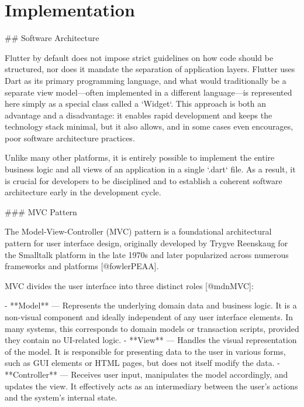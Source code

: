 \documentclass[
  digital,     %
  oneside,     %
  nosansbold,  %
  nocolorbold, %
  lof,         %
  lot,         %
]{fithesis4}
\begin{document}
\chapter{Implementation}
\shorthandoff{-}
\begin{markdown}

## Software Architecture

Flutter by default does not impose strict guidelines on how code should be structured, nor does it mandate the separation of application layers. Flutter uses Dart as its primary programming language, and what would traditionally be a separate view model—often implemented in a different language—is represented here simply as a special class called a `Widget`. This approach is both an advantage and a disadvantage: it enables rapid development and keeps the technology stack minimal, but it also allows, and in some cases even encourages, poor software architecture practices.

Unlike many other platforms, it is entirely possible to implement the entire business logic and all views of an application in a single `.dart` file. As a result, it is crucial for developers to be disciplined and to establish a coherent software architecture early in the development cycle.

### MVC Pattern

The Model-View-Controller (MVC) pattern is a foundational architectural pattern for user interface design, originally developed by Trygve Reenskaug for the Smalltalk platform in the late 1970s and later popularized across numerous frameworks and platforms [@fowlerPEAA].

MVC divides the user interface into three distinct roles [@mdnMVC]:

- **Model** — Represents the underlying domain data and business logic. It is a non-visual component and ideally independent of any user interface elements. In many systems, this corresponds to domain models or transaction scripts, provided they contain no UI-related logic.
- **View** — Handles the visual representation of the model. It is responsible for presenting data to the user in various forms, such as GUI elements or HTML pages, but does not itself modify the data.
- **Controller** — Receives user input, manipulates the model accordingly, and updates the view. It effectively acts as an intermediary between the user's actions and the system's internal state.


\end{markdown}
\end{document}
